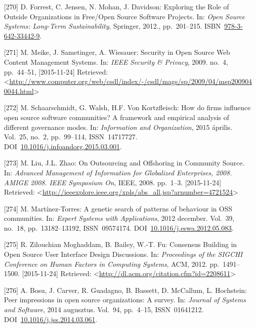 \documentclass[12pt,magyar,a4paper,oneside]{scrreprt}
\begin{document}
\leavevmode\hypertarget{ref-forrest_exploring_2012}{}%
{[}270{]} D. Forrest, C. Jensen, N. Mohan, J. Davidson: Exploring the
Role of Outside Organizations in Free/Open Source Software Projects. In:
\emph{Open Source Systems: Long-Term Sustainability}, Springer, 2012.,
pp.~201--215.
ISBN~\href{https://worldcat.org/isbn/978-3-642-33442-9}{978-3-642-33442-9}.

\leavevmode\hypertarget{ref-meike_security_2009}{}%
{[}271{]} M. Meike, J. Sametinger, A. Wiesauer: Security in Open Source
Web Content Management Systems. In: \emph{IEEE Security \& Privacy},
2009. no.~4, pp.~44--51, {[}2015-11-24{]} Retrieved:
\textless{}\url{http://www.computer.org/web/csdl/index/-/csdl/mags/sp/2009/04/msp2009040044.html}\textgreater{}

\leavevmode\hypertarget{ref-schaarschmidt_how_2015}{}%
{[}272{]} M. Schaarschmidt, G. Walsh, H.F. Von Kortzfleisch: How do
firms influence open source software communities? A framework and
empirical analysis of different governance modes. In: \emph{Information
and Organization}, 2015 április. Vol.~25, no.~2, pp.~99--114,
ISSN~14717727.
DOI~\href{https://doi.org/10.1016/j.infoandorg.2015.03.001}{10.1016/j.infoandorg.2015.03.001}.

\leavevmode\hypertarget{ref-liu_outsourcing_2008}{}%
{[}273{]} M. Liu, J.L. Zhao: On Outsourcing and Offshoring in Community
Source. In: \emph{Advanced Management of Information for Globalized
Enterprises, 2008. AMIGE 2008. IEEE Symposium On}, IEEE, 2008. pp.~1--3.
{[}2015-11-24{]} Retrieved:
\textless{}\url{http://ieeexplore.ieee.org/xpls/abs_all.jsp?arnumber=4721524}\textgreater{}

\leavevmode\hypertarget{ref-martinez-torres_genetic_2012}{}%
{[}274{]} M. Martínez-Torres: A genetic search of patterns of behaviour
in OSS communities. In: \emph{Expert Systems with Applications}, 2012
december. Vol.~39, no.~18, pp.~13182--13192, ISSN~09574174.
DOI~\href{https://doi.org/10.1016/j.eswa.2012.05.083}{10.1016/j.eswa.2012.05.083}.

\leavevmode\hypertarget{ref-zilouchian_moghaddam_consensus_2012}{}%
{[}275{]} R. Zilouchian Moghaddam, B. Bailey, W.-T. Fu: Consensus
Building in Open Source User Interface Design Discussions. In:
\emph{Proceedings of the SIGCHI Conference on Human Factors in Computing
Systems}, ACM, 2012. pp.~1491--1500. {[}2015-11-24{]} Retrieved:
\textless{}\url{http://dl.acm.org/citation.cfm?id=2208611}\textgreater{}

\leavevmode\hypertarget{ref-bosu_peer_2014}{}%
{[}276{]} A. Bosu, J. Carver, R. Guadagno, B. Bassett, D. McCallum, L.
Hochstein: Peer impressions in open source organizations: A survey. In:
\emph{Journal of Systems and Software}, 2014 augusztus. Vol.~94,
pp.~4--15, ISSN~01641212.
DOI~\href{https://doi.org/10.1016/j.jss.2014.03.061}{10.1016/j.jss.2014.03.061}.
\end{document}
